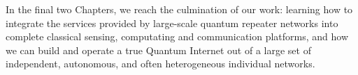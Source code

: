 \begin{partintro}
In the final two Chapters, we reach the culmination of our work: learning how to integrate the services provided by large-scale quantum repeater networks into complete classical sensing, computating and communication platforms, and how we can build and operate a true Quantum Internet out of a large set of independent, autonomous, and often heterogeneous individual networks.
\end{partintro}
